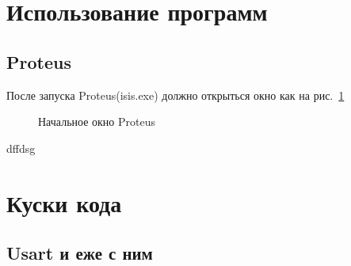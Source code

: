 \documentclass[12pt]{article}
\begin{document}
\section{Использование программ}
\subsection{Proteus}
После запуска Proteus(isis.exe) должно открыться окно как на рис.~\ref{p1} 
\begin{figure}[h]
\caption{Начальное окно Proteus}
\label{p1}
\end{figure}
\newline
dffdsg
\section{Куски кода}

\subsection{}
\subsection{}
\subsection{Usart и еже с ним}
\subsection{}
\end{document}
